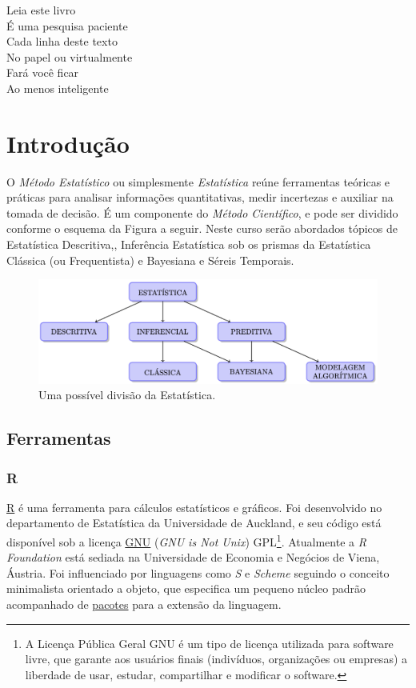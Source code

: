 \documentclass[
]{book}
\theoremstyle{definition}
\theoremstyle{definition}
\theoremstyle{definition}
\theoremstyle{remark}
\begin{document}
Leia este livro\\
É uma pesquisa paciente\\
Cada linha deste texto\\
No papel ou virtualmente\\
Fará você ficar\\
Ao menos inteligente

\hypertarget{introducao}{%
\chapter{Introdução}\label{introducao}}

O \emph{Método Estatístico} ou simplesmente \emph{Estatística} reúne ferramentas teóricas e práticas para analisar informações quantitativas, medir incertezas e auxiliar na tomada de decisão. É um componente do \emph{Método Científico}, e pode ser dividido conforme o esquema da Figura a seguir. Neste curso serão abordados tópicos de Estatística Descritiva,, Inferência Estatística sob os prismas da Estatística Clássica (ou Frequentista) e Bayesiana e Séreis Temporais.

\begin{figure}
\centering
\includegraphics{img/estat.png}
\caption{Uma possível divisão da Estatística.}
\end{figure}

\hypertarget{ferramentas}{%
\section{Ferramentas}\label{ferramentas}}

\hypertarget{r}{%
\subsection{R}\label{r}}

\href{https://www.r-project.org/}{R} é uma ferramenta para cálculos estatísticos e gráficos. Foi desenvolvido no departamento de Estatística da Universidade de Auckland, e seu código está disponível sob a licença \href{https://www.gnu.org/}{GNU} (\emph{GNU is Not Unix}) GPL\footnote{A Licença Pública Geral GNU é um tipo de licença utilizada para software livre, que garante aos usuários finais (indivíduos, organizações ou empresas) a liberdade de usar, estudar, compartilhar e modificar o software.}. Atualmente a \emph{R Foundation} está sediada na Universidade de Economia e Negócios de Viena, Áustria. Foi influenciado por linguagens como \emph{S} e \emph{Scheme} seguindo o conceito minimalista orientado a objeto, que especifica um pequeno núcleo padrão acompanhado de \href{https://cran.r-project.org/web/packages/}{pacotes} para a extensão da linguagem.
\end{document}
